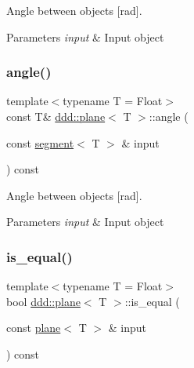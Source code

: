 Angle between objects \mbox{[}rad\mbox{]}. 


\begin{DoxyParams}{Parameters}
{\em input} & Input object \\
\hline
\end{DoxyParams}
\mbox{\label{classddd_1_1plane_a6a9a1c5fb177702ee67e330d803762ab}} 
\subsubsection{\texorpdfstring{angle()}{angle()}\hspace{0.1cm}{\footnotesize\ttfamily [5/5]}}
{\footnotesize\ttfamily template$<$typename T = Float$>$ \\
const T\& \hyperlink{classddd_1_1plane}{ddd\+::plane}$<$ T $>$\+::angle (\begin{DoxyParamCaption}\item[{const \hyperlink{classddd_1_1segment}{segment}$<$ T $>$ \&}]{input }\end{DoxyParamCaption}) const\hspace{0.3cm}{\ttfamily [inline]}}



Angle between objects \mbox{[}rad\mbox{]}. 


\begin{DoxyParams}{Parameters}
{\em input} & Input object \\
\hline
\end{DoxyParams}
\mbox{\label{classddd_1_1plane_aa1bb5a0628b0867a39f9484ec6e1f1df}} 
\subsubsection{\texorpdfstring{is\+\_\+equal()}{is\_equal()}}
{\footnotesize\ttfamily template$<$typename T = Float$>$ \\
bool \hyperlink{classddd_1_1plane}{ddd\+::plane}$<$ T $>$\+::is\+\_\+equal (\begin{DoxyParamCaption}\item[{const \hyperlink{classddd_1_1plane}{plane}$<$ T $>$ \&}]{input }\end{DoxyParamCaption}) const\hspace{0.3cm}{\ttfamily [inline]}}



